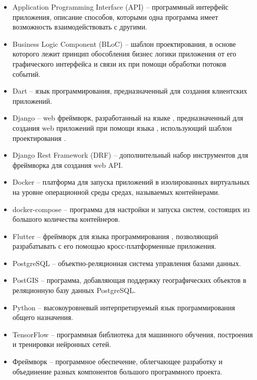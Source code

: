 

\begin{itemize}
	\item Application Programming Interface (API) -- программный интерфейс приложения, описание способов, которыми одна программа имеет возможность взаимодействовать с другими.
	\item Business Logic Component (BLoC) -- шаблон проектирования, в основе которого лежит принцип обособления бизнес логики приложения от его графического интерфейса и связи их при помощи обработки потоков событий.
	\item Dart -- язык программирования, предназначенный для создания клиентских приложений.
	\item Django -- web фреймворк, разработанный на языке , предназначенный для создания web приложений при помощи языка , использующий шаблон проектирования .
	\item Django Rest Framework (DRF) -- дополнительный набор инструментов для фреймворка  для создания web API.
	\item Docker -- платформа для запуска приложений в изолированных виртуальных на уровне операционной среды средах, называемых контейнерами.
	\item docker-compose -- программа для настройки и запуска систем, состоящих из большого количества  контейнеров.
	\item Flutter -- фреймворк для языка программирования , позволяющий разрабатывать с его помощью кросс-платформенные приложения.
	\item PostgreSQL -- объектно-реляционная система управления базами данных.
	\item PostGIS -- программа, добавляющая поддержку географических объектов в реляционную базу данных PostgreSQL.
	\item Python -- высокоуровневый интерпретируемый язык программирования общего назначения.
	\item TensorFlow -- программная библиотека для машинного обучения, построения и тренировки нейронных сетей.
	\item Фреймворк -- программное обеспечение, облегчающее разработку и объединение разных компонентов большого программного проекта.
\end{itemize}
